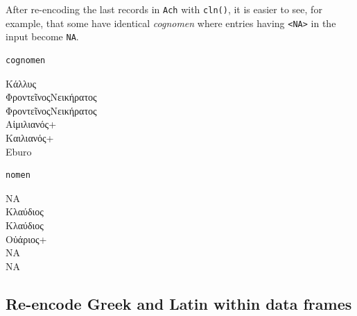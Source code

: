 \documentclass[a4paper,11pt]{memoir}
\newenvironment{Shaded}{\begin{snugshade}}{\end{snugshade}}
\newcommand{\CommentTok}[1]{\textcolor[rgb]{0.56,0.35,0.01}{\textit{#1}}}
\newcommand{\ErrorTok}[1]{\textcolor[rgb]{0.64,0.00,0.00}{\textbf{#1}}}
\newcommand{\KeywordTok}[1]{\textcolor[rgb]{0.13,0.29,0.53}{\textbf{#1}}}
\newcommand{\NormalTok}[1]{#1}
\newcommand{\OperatorTok}[1]{\textcolor[rgb]{0.81,0.36,0.00}{\textbf{#1}}}
\newcommand{\StringTok}[1]{\textcolor[rgb]{0.31,0.60,0.02}{#1}}
\begin{document}
After re-encoding the last records in \texttt{Ach} with \texttt{cln()},
it is easier to see, for example, that some have identical
\emph{cognomen} where entries having
\texttt{\textless{}NA\textgreater{}} in the input become \texttt{NA}.

\begin{Shaded}
\end{Shaded}

\begin{verbatim}
cognomen
\end{verbatim}

\noindent
Κάλλυς \\
ΦροντεῖνοςΝεικήρατος \\
ΦροντεῖνοςΝεικήρατος \\
Αἰμιλιανός+ \\
Καιλιανός+\\
Eburo\\

\begin{Shaded}
\end{Shaded}

\begin{verbatim}
nomen
\end{verbatim}

\noindent
NA \\
Κλαύδιος \\
Κλαύδιος \\
Οὐάριος+ \\
NA \\
NA\\


\hypertarget{re-encode-greek-and-latin-within-data-frames}{%
\subsection{Re-encode Greek and Latin within data
frames}\label{re-encode-greek-and-latin-within-data-frames}}
\end{document}
